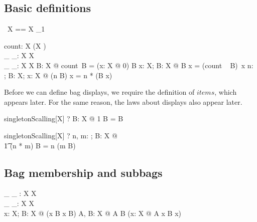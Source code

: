 \documentclass{article}
\begin{document}
\subsection{Basic definitions}

\begin{zed}
  \bag~X == X \pfun \nat_1
\end{zed}

\begin{gendef}[X]
  count: \bag X \bij (X \fun \nat) \\
  \_ \bcount \_: \bag X \cross X \fun \nat \\
  \_ \otimes \_: \nat \cross \bag X \fun \bag X
\where
  \forall B: \bag X @ count~B = (\lambda x: X @ 0) \oplus B
\also
  \forall x: X; B: \bag X @ B \bcount x = (count ~ B)~x
\also
\forall n: \nat; B: \bag X; x: X @  (n \otimes B) \bcount x = n * (B \bcount x)
\end{gendef}

Before we can define bag displays, we require the
definition of $items$, which appears later. For the
same reason, the laws about displays also appear later.

\begin{theorem}{singletonScalling}[X]
    \vdash? \forall B: \bag X @ 1 \otimes B = B
\end{theorem}
\begin{theorem}{singletonScalling}[X]
    \vdash? \forall n, m: \nat ; B: \bag X @ \\
         \t1 (n * m) \otimes B = n \otimes (m \otimes B)
\end{theorem}

\subsection{Bag membership and subbags}

\begin{gendef}[X]
  \_ \inbag \_ : X \rel \bag X \\
  \_ \subbageq \_: \bag X \rel \bag X \\
\where
  \forall x: X; B: \bag X @ (x \inbag B \iff x \in \dom B)
\also
  \forall A, B: \bag X @ A \subbageq B \iff
	(\forall x: X @ A \bcount x \leq B \bcount x)
\end{gendef}
\end{document}
